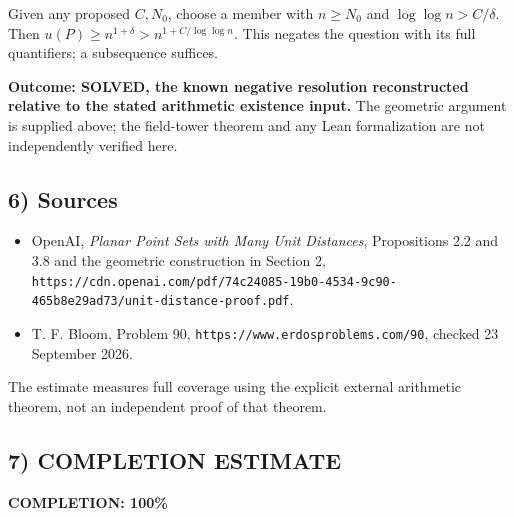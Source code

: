 Given any proposed $C,N_0$, choose a member with
$n\geq N_0$ and $\log\log n>C/\delta$. Then
$u(P)\geq n^{1+\delta}>n^{1+C/\log\log n}$. This negates the
question with its full quantifiers; a subsequence suffices.

\textbf{Outcome: SOLVED, the known negative resolution reconstructed
relative to the stated arithmetic existence input.} The geometric
argument is supplied above; the field-tower theorem and any Lean
formalization are not independently verified here.

\subsection{6) Sources}
\begin{itemize}
\item OpenAI, \emph{Planar Point Sets with Many Unit Distances},
Propositions 2.2 and 3.8 and the geometric construction in Section 2,
\texttt{https://cdn.openai.com/pdf/74c24085-19b0-4534-9c90-465b8e29ad73/unit-distance-proof.pdf}.
\item T. F. Bloom, Problem 90,
\texttt{https://www.erdosproblems.com/90}, checked 23 September 2026.
\end{itemize}
The estimate measures full coverage using the explicit external
arithmetic theorem, not an independent proof of that theorem.
\subsection{7) COMPLETION ESTIMATE}
\textbf{COMPLETION: 100\%}

